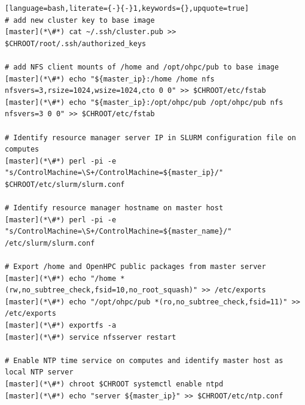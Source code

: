 \documentclass[letterpaper]{article}
\begin{document}
\begin{lstlisting}[language=bash,literate={-}{-}1,keywords={},upquote=true]
# add new cluster key to base image
[master](*\#*) cat ~/.ssh/cluster.pub >> $CHROOT/root/.ssh/authorized_keys

# add NFS client mounts of /home and /opt/ohpc/pub to base image
[master](*\#*) echo "${master_ip}:/home /home nfs nfsvers=3,rsize=1024,wsize=1024,cto 0 0" >> $CHROOT/etc/fstab
[master](*\#*) echo "${master_ip}:/opt/ohpc/pub /opt/ohpc/pub nfs nfsvers=3 0 0" >> $CHROOT/etc/fstab

# Identify resource manager server IP in SLURM configuration file on computes
[master](*\#*) perl -pi -e "s/ControlMachine=\S+/ControlMachine=${master_ip}/" $CHROOT/etc/slurm/slurm.conf

# Identify resource manager hostname on master host
[master](*\#*) perl -pi -e "s/ControlMachine=\S+/ControlMachine=${master_name}/" /etc/slurm/slurm.conf

# Export /home and OpenHPC public packages from master server
[master](*\#*) echo "/home *(rw,no_subtree_check,fsid=10,no_root_squash)" >> /etc/exports
[master](*\#*) echo "/opt/ohpc/pub *(ro,no_subtree_check,fsid=11)" >> /etc/exports
[master](*\#*) exportfs -a
[master](*\#*) service nfsserver restart

# Enable NTP time service on computes and identify master host as local NTP server
[master](*\#*) chroot $CHROOT systemctl enable ntpd
[master](*\#*) echo "server ${master_ip}" >> $CHROOT/etc/ntp.conf
\end{lstlisting}



\end{document}
